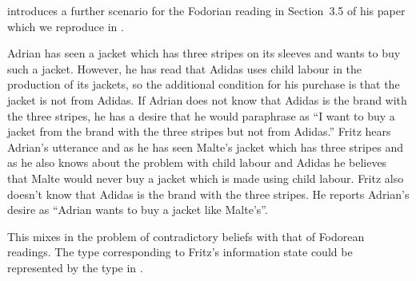 \cite{Prossms} introduces a further scenario for the Fodorian reading
in Section~3.5 of his paper which we reproduce in \nexteg{}.
\begin{ex} 
Adrian has seen a jacket which has three stripes on its sleeves and wants to buy such a jacket. However, he has read that Adidas uses child labour in the production of its jackets, so the additional condition for his purchase is that the jacket is not from Adidas. If Adrian does not know that Adidas is the brand with the three stripes, he has a desire that he would paraphrase as
``I want to buy a jacket from the brand with the three stripes but not from Adidas.'' Fritz hears Adrian's utterance and as he has seen Malte's jacket which has three stripes and as he also knows about the problem with child labour and Adidas he believes that Malte would never buy a jacket which is made using child labour. Fritz also doesn't know that Adidas is the brand with the three stripes. He reports Adrian's desire as ``Adrian wants to buy a jacket like Malte's''.
 
\end{ex} 
This mixes in the problem of contradictory beliefs with that of
Fodorean readings.  The type corresponding to Fritz's information
state could be represented by the type in \nexteg{}.
\begin{ex} 
\end{ex} 
